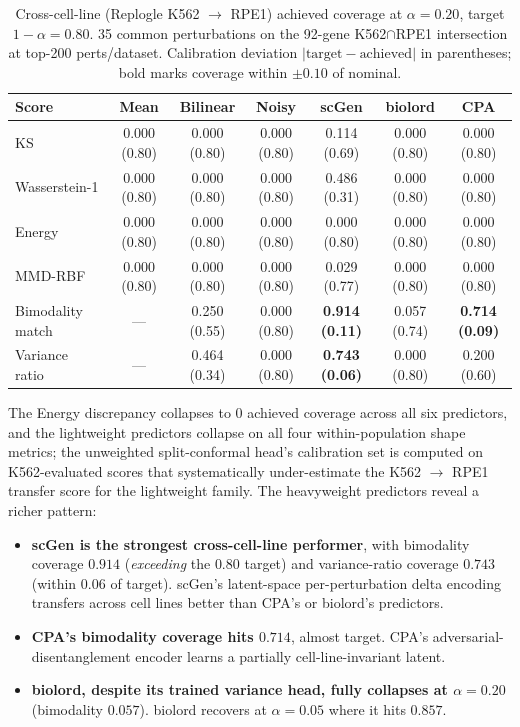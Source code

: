 \documentclass{article}
\begin{document}
\begin{table}[h]
\caption{Cross-cell-line (Replogle K562 $\rightarrow$ RPE1) achieved coverage at $\alpha = 0.20$, target $1 - \alpha = 0.80$. 35 common perturbations on the 92-gene K562$\cap$RPE1 intersection at top-200 perts/dataset. Calibration deviation $|\text{target} - \text{achieved}|$ in parentheses; bold marks coverage within $\pm 0.10$ of nominal.}
\label{tab:xcl}
\centering
\small
\begin{tabular}{lcccccc}
\toprule
Score & Mean & Bilinear & Noisy & scGen & biolord & CPA \\
\midrule
KS                  & 0.000 (0.80) & 0.000 (0.80) & 0.000 (0.80) & 0.114 (0.69) & 0.000 (0.80) & 0.000 (0.80) \\
Wasserstein-1       & 0.000 (0.80) & 0.000 (0.80) & 0.000 (0.80) & 0.486 (0.31) & 0.000 (0.80) & 0.000 (0.80) \\
Energy              & 0.000 (0.80) & 0.000 (0.80) & 0.000 (0.80) & 0.000 (0.80) & 0.000 (0.80) & 0.000 (0.80) \\
MMD-RBF             & 0.000 (0.80) & 0.000 (0.80) & 0.000 (0.80) & 0.029 (0.77) & 0.000 (0.80) & 0.000 (0.80) \\
Bimodality match    & ---          & 0.250 (0.55) & 0.000 (0.80) & \textbf{0.914 (0.11)} & 0.057 (0.74) & \textbf{0.714 (0.09)} \\
Variance ratio      & ---          & 0.464 (0.34) & 0.000 (0.80) & \textbf{0.743 (0.06)} & 0.000 (0.80) & 0.200 (0.60) \\
\bottomrule
\end{tabular}
\end{table}

The Energy discrepancy collapses to $0$ achieved coverage across all six predictors, and the lightweight predictors collapse on all four within-population shape metrics; the unweighted split-conformal head's calibration set is computed on K562-evaluated scores that systematically under-estimate the K562 $\rightarrow$ RPE1 transfer score for the lightweight family. The heavyweight predictors reveal a richer pattern:
\begin{itemize}
\item \textbf{scGen is the strongest cross-cell-line performer}, with bimodality coverage $0.914$ (\emph{exceeding} the $0.80$ target) and variance-ratio coverage $0.743$ (within $0.06$ of target). scGen's latent-space per-perturbation delta encoding transfers across cell lines better than CPA's or biolord's predictors.
\item \textbf{CPA's bimodality coverage hits $0.714$}, almost target. CPA's adversarial-disentanglement encoder learns a partially cell-line-invariant latent.
\item \textbf{biolord, despite its trained variance head, fully collapses at $\alpha = 0.20$} (bimodality $0.057$). biolord recovers at $\alpha = 0.05$ where it hits $0.857$.
\end{itemize}
\end{document}
